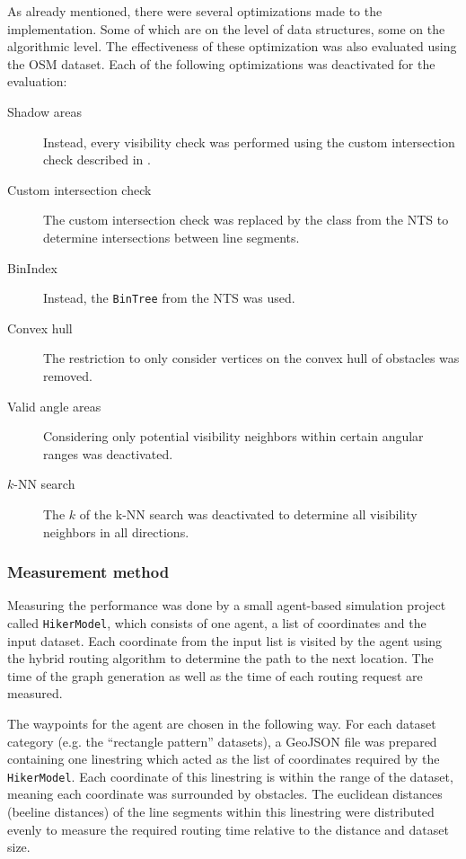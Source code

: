 			As  already mentioned, there were several optimizations made to the implementation.
			Some of which are on the level of data structures, some on the algorithmic level.
			The effectiveness of these optimization was also evaluated using the OSM dataset.
			Each of the following optimizations was deactivated for the evaluation:

			\begin{description}
				\item[Shadow areas] Instead, every visibility check was performed using the custom intersection check described in .
				\item[Custom intersection check] The custom intersection check was replaced by the  class from the NTS to determine intersections between line segments.
				\item[BinIndex] Instead, the \texttt{BinTree} from the NTS was used.
				\item[Convex hull] The restriction to only consider vertices on the convex hull of obstacles was removed.
				\item[Valid angle areas] Considering only potential visibility neighbors within certain angular ranges was deactivated.
				\item[$k$-NN search] The $k$ of the k-NN search was deactivated to determine all visibility neighbors in all directions.
			\end{description}		
			
		\subsubsection{Measurement method}
		
			Measuring the performance was done by a small agent-based simulation project called \texttt{HikerModel}, which consists of one agent, a list of coordinates and the input dataset.
			Each coordinate from the input list is visited by the agent using the hybrid routing algorithm to determine the path to the next location.
			The time of the graph generation as well as the time of each routing request are measured.
			
			The waypoints for the agent are chosen in the following way.
			For each dataset category (e.g. the \enquote{rectangle pattern} datasets), a GeoJSON file was prepared containing one linestring which acted as the list of coordinates required by the \texttt{HikerModel}.
			Each coordinate of this linestring is within the range of the dataset, meaning each coordinate was surrounded by obstacles.
			The euclidean distances (beeline distances) of the line segments within this linestring were distributed evenly to measure the required routing time relative to the distance and dataset size.
			
